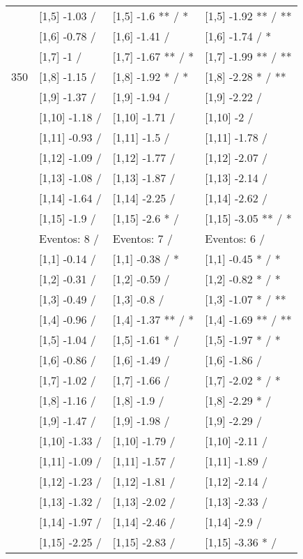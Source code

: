 \begin{table}
\begin{tabular}[t]{llll}
 & {}[1,5] -1.03  / & {}[1,5] -1.6 ** / * & {}[1,5] -1.92 ** / **\\
 & {}[1,6] -0.78  / & {}[1,6] -1.41  / & {}[1,6] -1.74  / *\\
 & {}[1,7] -1  / & {}[1,7] -1.67 ** / * & {}[1,7] -1.99 ** / **\\
350 & {}[1,8] -1.15  / & {}[1,8] -1.92 * / * & {}[1,8] -2.28 * / **\\
\addlinespace
 & {}[1,9] -1.37  / & {}[1,9] -1.94  / & {}[1,9] -2.22  /\\
 & {}[1,10] -1.18  / & {}[1,10] -1.71  / & {}[1,10] -2  /\\
 & {}[1,11] -0.93  / & {}[1,11] -1.5  / & {}[1,11] -1.78  /\\
 & {}[1,12] -1.09  / & {}[1,12] -1.77  / & {}[1,12] -2.07  /\\
 & {}[1,13] -1.08  / & {}[1,13] -1.87  / & {}[1,13] -2.14  /\\
\addlinespace
 & {}[1,14] -1.64  / & {}[1,14] -2.25  / & {}[1,14] -2.62  /\\
 & {}[1,15] -1.9  / & {}[1,15] -2.6 * / & {}[1,15] -3.05 ** / *\\
 & Eventos:  8 / & Eventos:  7 / & Eventos:  6 /\\
 & {}[1,1] -0.14  / & {}[1,1] -0.38  / * & {}[1,1] -0.45 * / *\\
 & {}[1,2] -0.31  / & {}[1,2] -0.59  / & {}[1,2] -0.82 * / *\\
\addlinespace
 & {}[1,3] -0.49  / & {}[1,3] -0.8  / & {}[1,3] -1.07 * / **\\
 & {}[1,4] -0.96  / & {}[1,4] -1.37 ** / * & {}[1,4] -1.69 ** / **\\
 & {}[1,5] -1.04  / & {}[1,5] -1.61 * / & {}[1,5] -1.97 * / *\\
 & {}[1,6] -0.86  / & {}[1,6] -1.49  / & {}[1,6] -1.86  /\\
 & {}[1,7] -1.02  / & {}[1,7] -1.66  / & {}[1,7] -2.02 * / *\\
\addlinespace
500 & {}[1,8] -1.16  / & {}[1,8] -1.9  / & {}[1,8] -2.29 * /\\
 & {}[1,9] -1.47  / & {}[1,9] -1.98  / & {}[1,9] -2.29  /\\
 & {}[1,10] -1.33  / & {}[1,10] -1.79  / & {}[1,10] -2.11  /\\
 & {}[1,11] -1.09  / & {}[1,11] -1.57  / & {}[1,11] -1.89  /\\
 & {}[1,12] -1.23  / & {}[1,12] -1.81  / & {}[1,12] -2.14  /\\
\addlinespace
 & {}[1,13] -1.32  / & {}[1,13] -2.02  / & {}[1,13] -2.33  /\\
 & {}[1,14] -1.97  / & {}[1,14] -2.46  / & {}[1,14] -2.9  /\\
 & {}[1,15] -2.25  / & {}[1,15] -2.83  / & {}[1,15] -3.36 * /\\
\bottomrule
\end{tabular}
\end{table}
